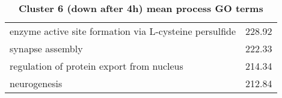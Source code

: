 \begin{table}[hp]
\begin{center}
\begin{tabular}{p{}r}
enzyme active site formation via L-cysteine persulfide                  & 228.92                      \\
synapse assembly                                                        & 222.33                      \\
regulation of protein export from nucleus                               & 214.34                      \\
neurogenesis                                                            & 212.84                      \\ \bottomrule
\end{tabular}
\end{center}

\caption[Cluster 6 (down after 4h) mean process GO terms]{\sf \textbf{Cluster 6 (down after 4h) mean process GO terms}}
\label{tab:cls6-process}
\end{table}